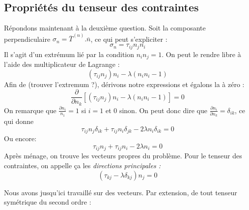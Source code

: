     \subsection{Propriétés du tenseur des contraintes}
    Répondons maintenant à la deuxième question. Soit la composante perpendiculaire $\sigma_n 
    = \overline{T}^{(n)}.\overline{n}$, ce qui peut s'expliciter :
    \begin{equation}
    \sigma_n = \tau_{ij}n_jn_i
    \end{equation}
    Il s'agit d'un extrémum lié par la condition $n_in_j=1$. On peut le rendre libre à l'aide des 
    multiplicateur de Lagrange :
    \begin{equation}
    (\tau_{ij}n_j)n_i - \lambda (n_in_i - 1)
    \end{equation}
    Afin de (trouver l'extremum ?), dérivons notre expressions et égalons la à zéro :
    \begin{equation}
    \frac{\partial}{\partial n_k}[(\tau_{ij}n_j)n_i - \lambda (n_in_i - 1)] = 0
    \end{equation}
    On remarque que $\frac{\partial n_i}{n_1} = 1$ si $i=1$ et 0 sinon. On peut donc dire que 
    $\frac{\partial n_i}{\partial n_k} = \delta_{ik}$, ce qui donne 
    \begin{equation}
    \tau_{ij}n_j\delta_{ik} + \tau_{ij}n_i \delta_{jk} - 2\lambda n_i \delta_{ik} = 0
    \end{equation}
    Ou encore:
    \begin{equation}
    \tau_{ij}n_j + \tau_{ij}n_i - 2\lambda n_i  = 0
    \end{equation}
    Après ménage, on trouve les vecteurs propres du problème. Pour le tenseur des contraintes, on appelle
    ça les \textit{directions principales :}
    \begin{equation}
    (\tau_{kj} - \lambda\delta_{kj})n_j = 0
    \end{equation}
    
    Nous avons jusqu'ici travaillé sur des vecteurs. Par extension, de tout tenseur symétrique du second
    ordre :\\
    
    
